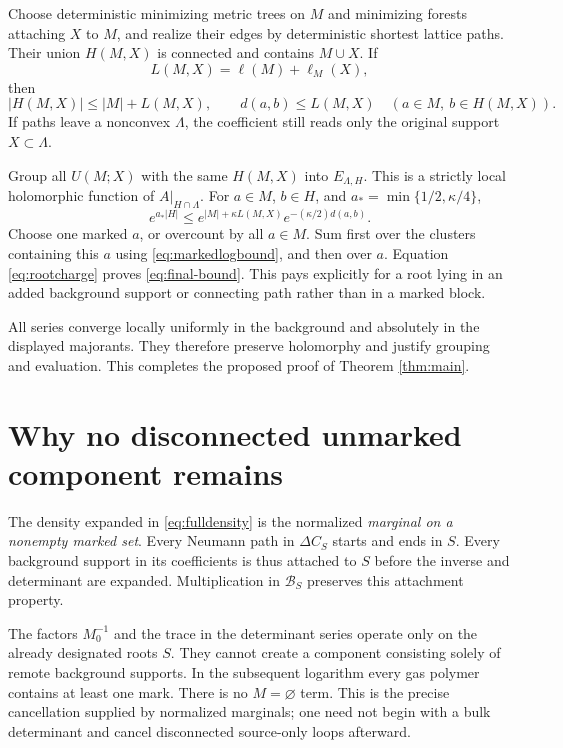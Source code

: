 \documentclass[11pt]{article}
\newcommand{\Bcal}{\mathcal B}
\begin{document}
Choose deterministic minimizing metric trees on $M$ and minimizing
forests attaching $X$ to $M$, and realize their edges by deterministic
shortest lattice paths. Their union $H(M,X)$ is connected and contains
$M\cup X$. If
\[
 L(M,X)=\ell(M)+\ell_M(X),
\]
then
\begin{equation}
 |H(M,X)|\le|M|+L(M,X),\qquad
 d(a,b)\le L(M,X)\quad(a\in M,\ b\in H(M,X)).
 \label{eq:hull}
\end{equation}
If paths leave a nonconvex $\Lambda$, the coefficient still reads
only the original support $X\subset\Lambda$.

Group all $U(M;X)$ with the same $H(M,X)$ into $E_{\Lambda,H}$.
This is a strictly local holomorphic function of $A|_{H\cap\Lambda}$.
For $a\in M$, $b\in H$, and $a_*=\min\{1/2,\kappa/4\}$,
\begin{equation}
 e^{a_*|H|}
 \le e^{|M|+\kappa L(M,X)}e^{-(\kappa/2)d(a,b)}.
 \label{eq:rootcharge}
\end{equation}
Choose one marked $a$, or overcount by all $a\in M$.
Sum first over the clusters containing this $a$ using
\eqref{eq:markedlogbound}, and then over $a$.
Equation \eqref{eq:rootcharge} proves \eqref{eq:final-bound}.
This pays explicitly for a root lying in an added background support
or connecting path rather than in a marked block.

All series converge locally uniformly in the background and absolutely
in the displayed majorants. They therefore preserve holomorphy and
justify grouping and evaluation. This completes the proposed proof
of Theorem \ref{thm:main}.

\section{Why no disconnected unmarked component remains}

The density expanded in \eqref{eq:fulldensity} is the normalized
\emph{marginal on a nonempty marked set}. Every Neumann path in
$\Delta C_S$ starts and ends in $S$.
Every background support in its coefficients is thus attached to $S$
before the inverse and determinant are expanded. Multiplication in
$\Bcal_S$ preserves this attachment property.

The factors $M_0^{-1}$ and the trace in the determinant series operate
only on the already designated roots $S$.
They cannot create a component consisting solely of remote
background supports. In the subsequent logarithm every gas polymer
contains at least one mark. There is no $M=\varnothing$ term.
This is the precise cancellation supplied by normalized marginals;
one need not begin with a bulk determinant and cancel disconnected
source-only loops afterward.
\end{document}
